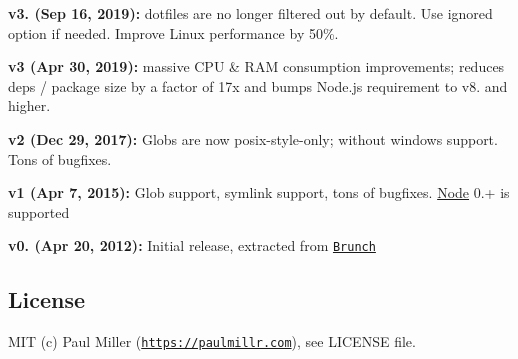 \begin{DoxyItemize}
\item {\bfseries v3. (Sep 16, 2019)\+:} dotfiles are no longer filtered out by default. Use {\ttfamily ignored} option if needed. Improve Linux performance by 50\%.
\item {\bfseries v3 (Apr 30, 2019)\+:} massive C\+PU \& R\+AM consumption improvements; reduces deps / package size by a factor of 17x and bumps Node.\+js requirement to v8. and higher.
\item {\bfseries v2 (Dec 29, 2017)\+:} Globs are now posix-\/style-\/only; without windows support. Tons of bugfixes.
\item {\bfseries v1 (Apr 7, 2015)\+:} Glob support, symlink support, tons of bugfixes. \mbox{\hyperlink{classNode}{Node}} 0.+ is supported
\item {\bfseries v0. (Apr 20, 2012)\+:} Initial release, extracted from \href{https://github.com/brunch/brunch/blob/9847a065aea300da99bd0753f90354cde9de1261/src/helpers.coffee#L66}{\tt Brunch}
\end{DoxyItemize}

\subsection*{License}

M\+IT (c) Paul Miller (\href{https://paulmillr.com}{\tt https\+://paulmillr.\+com}), see L\+I\+C\+E\+N\+SE file. 
